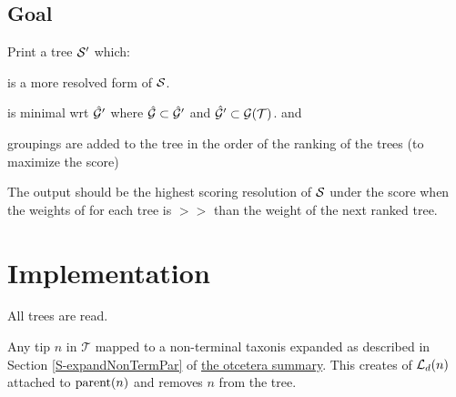 \documentclass[11pt]{article}
\newcommand{\summDoc}{\href{http://phylo.bio.ku.edu/ot/summarizing-taxonomy-plus-trees.pdf}{the otcetera summary}\xspace}
\newcommand{\summRef}[1]{Section \ref{S-#1} of \summDoc}
\begin{document}
\subsection*{Goal}
Print a tree $\mathcal{S}^{\prime}$ which:
\begin{compactitem}
    \item is a more resolved form of $\mathcal{S}$.
    \item is minimal wrt $\hat{\mathcal{G}}^{\prime}$ where $\hat{\mathcal{G}} \subset \hat{\mathcal{G}}^{\prime}$ and $\hat{\mathcal{G}}^{\prime} \subset \mathcal{G}(\mathcal{T})$. and 
    \item groupings are added to the tree in the order of the ranking of the trees (to maximize the \SWIPSD score)
\end{compactitem}

The output should be the highest scoring resolution of $\mathcal{S}$ under the \SWIPSD score when the
    weights of for each tree is $>>$ than the weight of the next ranked tree.

\section*{Implementation}
\begin{compactenum}
    \item All trees are read.
    \item Any tip $n$ in $\mathcal{T}$ mapped to a non-terminal taxonis expanded as described in \summRef{expandNonTermPar}. This creates of $\mathcal{L}_d(n)$ attached to $\mbox{parent}(n)$ and removes $n$ from the tree.
\end{compactenum}
\end{document}
